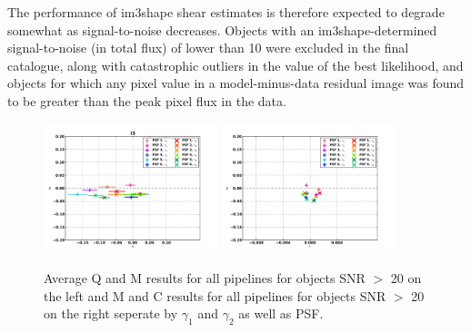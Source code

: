 The performance of im3shape shear estimates is therefore expected to degrade somewhat as signal-to-noise decreases.  Objects with an im3shape-determined signal-to-noise (in total flux) of lower than 10 were excluded in the final catalogue, along with catastrophic outliers in the value of the best likelihood, and objects for which any pixel value in a model-minus-data residual image was found to be greater than the peak pixel flux in the data.
\begin{figure}
\centering
\includegraphics[width=0.45\textwidth]{fig/QMC_main_I3_f.pdf} 
\includegraphics[width=0.45\textwidth]{fig/MC_main_I3_f.pdf} 
\caption{Average Q and M results for all pipelines for objects 
SNR $>$ 20 on the left and M and C results for all pipelines for objects 
SNR $>$ 20 on the right seperate by $\gamma_{1} $ and $\gamma_{2} $ as
well as PSF.}
\label{fig:im3shape_qmc}
\end{figure}

